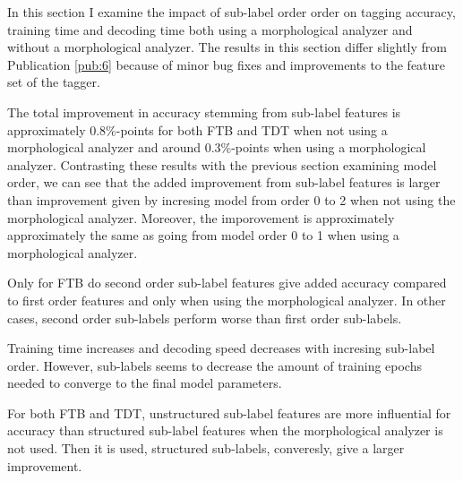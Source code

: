 In this section I examine the impact of sub-label order order on
tagging accuracy, training time and decoding time both using a
morphological analyzer and without a morphological analyzer. The
results in this section differ slightly from Publication \ref{pub:6}
because of minor bug fixes and improvements to the feature set of the
tagger.

The total improvement in accuracy stemming from sub-label features is
approximately 0.8\%-points for both FTB and TDT when not using a
morphological analyzer and around 0.3\%-points when using a
morphological analyzer. Contrasting these results with the previous
section examining model order, we can see that the added improvement
from sub-label features is larger than improvement given by incresing
model from order 0 to 2 when not using the morphological
analyzer. Moreover, the imporovement is approximately approximately
the same as going from model order 0 to 1 when using a morphological
analyzer.

Only for FTB do second order sub-label features give added accuracy
compared to first order features and only when using the morphological
analyzer. In other cases, second order sub-labels perform worse than
first order sub-labels.

Training time increases and decoding speed decreases with incresing
sub-label order. However, sub-labels seems to decrease the amount of
training epochs needed to converge to the final model parameters.

For both FTB and TDT, unstructured sub-label features are more
influential for accuracy than structured sub-label features when the
morphological analyzer is not used. Then it is used, structured
sub-labels, converesly, give a larger improvement.


